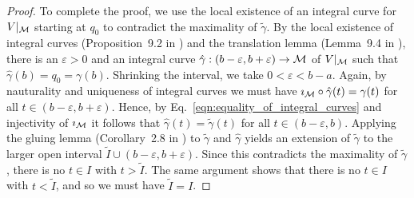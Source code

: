 \documentclass[twoside,11pt]{article}
\begin{document}
\begin{proof}
    To complete the proof, we use the local existence of an integral curve for $V\vert_{{\mathcal{M}}}$ starting at $q_0$ to contradict the maximality of $\tilde{\gamma}$.
    By the local existence of integral curves (Proposition~9.2 in \cite{Lee2013introduction}) and the translation lemma (Lemma~9.4 in \cite{Lee2013introduction}), there is an $\varepsilon > 0$ and an integral curve $\hat{\gamma}: (b-\varepsilon, b+\varepsilon) \to {\mathcal{M}}$ of $V\vert_{{\mathcal{M}}}$ such that $\hat{\gamma}(b) = q_0 = \gamma(b)$.
    Shrinking the interval, we take $0<\varepsilon < b-a$.
    Again, by nauturality and uniqueness of integral curves we must have $\imath_{{\mathcal{M}}} \circ \hat{\gamma}(t) = \gamma(t)$ for all $t\in (b-\varepsilon, b+\varepsilon)$.
    Hence, by Eq.~\ref{eqn:equality_of_integral_curves} and injectivity of $\imath_{{\mathcal{M}}}$ it follows that $\hat{\gamma}(t) = \tilde\gamma(t)$ for all $t\in (b-\varepsilon, b)$.
    Applying the gluing lemma (Corollary~2.8 in \cite{Lee2013introduction}) to $\tilde{\gamma}$ and $\hat{\gamma}$ yields an extension of $\tilde{\gamma}$ to the larger open interval $\tilde{I} \cup (b-\varepsilon, b+\varepsilon)$.
    Since this contradicts the maximality of $\tilde{\gamma}$, there is no $t \in I$ with $t > \tilde{I}$.
    The same argument shows that there is no $t \in I$ with $t < \tilde{I}$, and so we must have $\tilde{I} = I$.
\end{proof}
\end{document}
